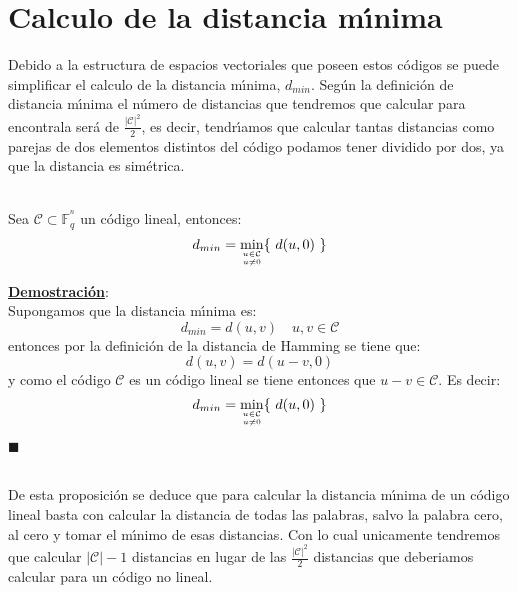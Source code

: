 %
%

\section{Calculo de la distancia m\'{\i}nima}

Debido a la estructura de espacios vectoriales que poseen estos c\'odigos se
puede simplificar el calculo de la distancia m\'{\i}nima, $d_{min}$. Seg\'un
la definici\'on de distancia m\'{\i}nima el n\'umero de distancias que tendremos
que calcular para encontrala ser\'a de $\frac{|\mathcal{C}|^2}{2}$, es decir,
tendr\'{\i}amos que calcular tantas distancias como parejas de dos elementos
distintos del c\'odigo podamos tener dividido por dos, ya que la distancia es
sim\'etrica. \\

\begin{proposicion}
\ \\
Sea $\mathcal{C}\subset \mathbb{F}^{^n}_q$ un c\'odigo lineal, entonces:
$$d_{min} = \min_{u \in \mathcal{C}\atop u\neq 0} \{\ d(u,0)\ \}$$
\end{proposicion}
\underline{\textbf{Demostraci\'on}}:\ \\
Supongamos que la distancia m\'{\i}nima es:
$$d_{min} = d(u,v)\quad u,v\in \mathcal{C}$$
entonces por la definici\'on de la distancia de Hamming se tiene que:
$$d(u,v)=d(u-v,0)$$ y como el c\'odigo $\mathcal{C}$ es un c\'odigo lineal se
tiene entonces que $u-v\in \mathcal{C}$. Es decir:
$$d_{min}= \min_{u\in \mathcal{C} \atop u\neq 0} \{\ d(u,0)\ \}$$
\begin{flushright}
$\blacksquare$
\end{flushright}
\begin{observacion}
\ \\
De esta proposici\'on se deduce que para calcular la distancia m\'{\i}nima de 
un c\'odigo lineal basta con calcular la distancia de todas las palabras, salvo
la palabra cero, al cero y tomar el m\'{\i}nimo de esas distancias. Con lo cual
unicamente tendremos que calcular $|\mathcal{C}|-1$ distancias en lugar de las
$\frac{|\mathcal{C}|^2}{2}$ distancias que deberiamos calcular para un c\'odigo
no lineal.
\end{observacion}
